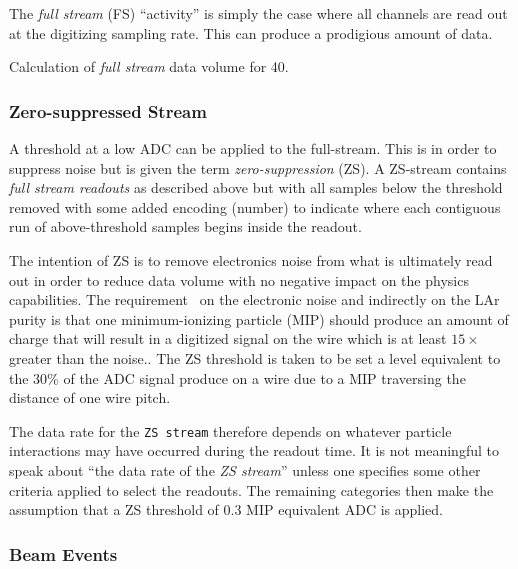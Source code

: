 The \textit{full stream} (FS) ``activity'' is simply the case where
all channels are read out at the digitizing sampling rate.
This can produce a prodigious amount of data.


\begin{table}[htbp]
  \centering
  \caption{Calculation of \textit{full stream} data volume for
    \SI{40}{\kton}.}
  
  \label{tab:full-stream}
\end{table}

\subsubsection{Zero-suppressed Stream}

A threshold at a low ADC can be applied to the full-stream.
This is in order to suppress noise but is given the term
\textit{zero-suppression} (ZS).
A ZS-stream contains \textit{full stream readouts} as described above
but with all samples below the threshold removed with some added
encoding (number) to indicate where each contiguous run of
above-threshold samples begins inside the readout.

The intention of ZS is to remove electronics noise from what is
ultimately read out in order to reduce data volume with no negative
impact on the physics capabilities.
The requirement~\cite{docdb3383} on the electronic noise and
indirectly on the LAr purity is that one minimum-ionizing particle
(MIP) should produce an amount of charge that will result in a
digitized signal on the wire which is at least $15\times$ greater than
the noise..
The ZS threshold is taken to be set a level equivalent to the 30\% of
the ADC signal produce on a wire due to a MIP traversing the distance
of one wire pitch.

The data rate for the \texttt{ZS stream} therefore depends on whatever
particle interactions may have occurred during the readout time.
It is not meaningful to speak about ``the data rate of the \textit{ZS
  stream}'' unless one specifies some other criteria applied to select
the readouts.
The remaining categories then make the assumption that a ZS threshold
of \num{0.3} MIP equivalent ADC is applied.

\subsubsection{Beam Events}

